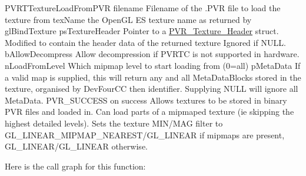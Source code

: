   P\+V\+R\+T\+Texture\+Load\+From\+P\+V\+R  filename Filename of the .P\+V\+R file to load the texture from  tex\+Name the Open\+G\+L E\+S texture name as returned by gl\+Bind\+Texture  ps\+Texture\+Header Pointer to a \hyperlink{struct_p_v_r___texture___header}{P\+V\+R\+\_\+\+Texture\+\_\+\+Header} struct. Modified to contain the header data of the returned texture Ignored if N\+U\+L\+L.  b\+Allow\+Decompress Allow decompression if P\+V\+R\+T\+C is not supported in hardware.  n\+Load\+From\+Level Which mipmap level to start loading from (0=all)  p\+Meta\+Data If a valid map is supplied, this will return any and all Meta\+Data\+Blocks stored in the texture, organised by Dev\+Four\+C\+C then identifier. Supplying N\+U\+L\+L will ignore all Meta\+Data.  P\+V\+R\+\_\+\+S\+U\+C\+C\+E\+S\+S on success  Allows textures to be stored in binary P\+V\+R files and loaded in. Can load parts of a mipmaped texture (ie skipping the highest detailed levels). Sets the texture M\+I\+N/\+M\+A\+G filter to G\+L\+\_\+\+L\+I\+N\+E\+A\+R\+\_\+\+M\+I\+P\+M\+A\+P\+\_\+\+N\+E\+A\+R\+E\+S\+T/\+G\+L\+\_\+\+L\+I\+N\+E\+A\+R if mipmaps are present, G\+L\+\_\+\+L\+I\+N\+E\+A\+R/\+G\+L\+\_\+\+L\+I\+N\+E\+A\+R otherwise. 

Here is the call graph for this function\+:


